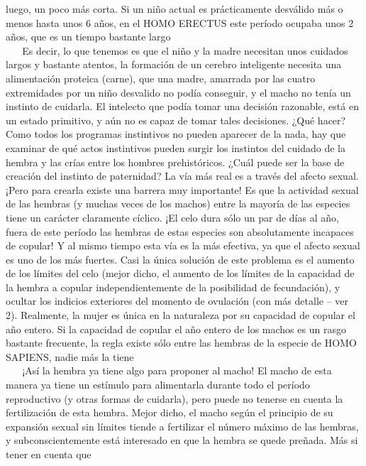 luego, un poco más corta. Si un niño actual es prácticamente desválido
más o menos hasta unos 6 años, en el HOMO ERECTUS este período ocupaba
unos 2 años, que es un tiempo bastante largo\\
\hspace*{0.333em} ~ ~ Es decir, lo que tenemos es que el niño y la madre
necesitan unos cuidados largos y bastante atentos, la formación de un
cerebro inteligente necesita una alimentación proteica (carne), que una
madre, amarrada por las cuatro extremidades por un niño desvalido no
podía conseguir, y el macho no tenía un instinto de cuidarla. El
intelecto que podía tomar una decisión razonable, está en un estado
primitivo, y aún no es capaz de tomar tales decisiones. ¿Qué hacer? Como
todos los programas instintivos no pueden aparecer de la nada, hay que
examinar de qué actos instintivos pueden surgir los instintos del
cuidado de la hembra y las crías entre los hombres prehistóricos. ¿Cuál
puede ser la base de creación del instinto de paternidad? La vía más
real es a través del afecto sexual. ¡Pero para crearla existe una
barrera muy importante! Es que la actividad sexual de las hembras (y
muchas veces de los machos) entre la mayoría de las especies tiene un
carácter claramente cíclico. ¡El celo dura sólo un par de días al año,
fuera de este período las hembras de estas especies son absolutamente
incapaces de copular! Y al mismo tiempo esta vía es la más efectiva, ya
que el afecto sexual es uno de los más fuertes. Casi la única solución
de este problema es el aumento de los límites del celo (mejor dicho, el
aumento de los límites de la capacidad de la hembra a copular
independientemente de la posibilidad de fecundación), y ocultar los
indicios exteriores del momento de ovulación (con más detalle -- ver 2).
Realmente, la mujer es única en la naturaleza por su capacidad de
copular el año entero. Si la capacidad de copular el año entero de los
machos es un rasgo bastante frecuente, la regla existe sólo entre las
hembras de la especie de HOMO SAPIENS, nadie más la tiene\\
\hspace*{0.333em} ~ ~ ¡Así la hembra ya tiene algo para proponer al
macho! El macho de esta manera ya tiene un estímulo para alimentarla
durante todo el período reproductivo (y otras formas de cuidarla), pero
puede no tenerse en cuenta la fertilización de esta hembra. Mejor dicho,
el macho según el principio de su expansión sexual sin límites tiende a
fertilizar el número máximo de las hembras, y subconscientemente está
interesado en que la hembra se quede preñada. Más si tener en cuenta que
